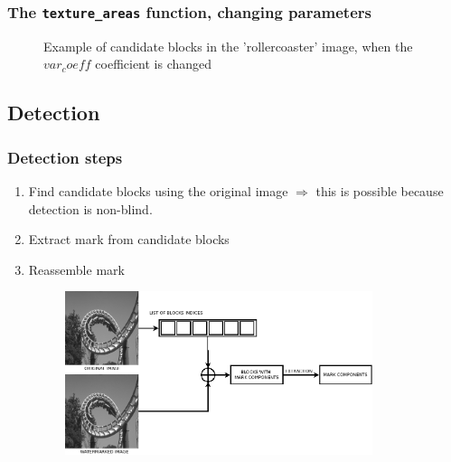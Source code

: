 \begin{frame}
    \frametitle{The \texttt{texture\_areas} function, changing parameters}
    \begin{figure}[h]
        \centering
         \quad
        \caption{Example of candidate blocks in the 'rollercoaster' image, when the $var_coeff$ coefficient is changed}
        \label{fig:blocks_rollecoaster_3}
    \end{figure}
\end{frame}

\subsection{Detection}

\begin{frame}
    \frametitle{Detection steps}
    \begin{enumerate}
        \item<1-> Find candidate blocks using the original image  $\Rightarrow$ this is possible because detection is non-blind.
        \item<2-> Extract mark from candidate blocks
        \item<3-> Reassemble mark
              \begin{figure}[h]
                  \centering
                  \includegraphics[width=0.85\textwidth]{../drawable/extracting-blocks.png}
                  \label{fig:mark_extraction}
              \end{figure}
    \end{enumerate}
\end{frame}

